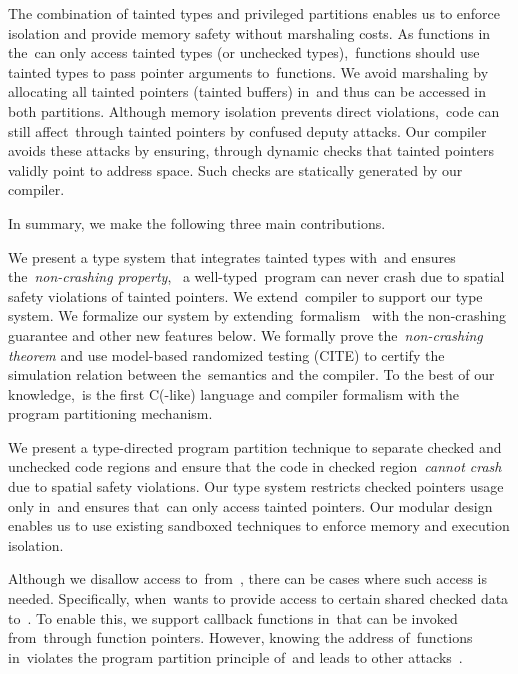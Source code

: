 The combination of tainted types and privileged partitions enables us to enforce isolation and provide memory safety without marshaling costs.
As functions in the~\ucregion can only access tainted types (or unchecked types),~\cregion functions should use tainted types to pass pointer arguments to~\ucregion functions. 
We avoid marshaling by allocating all tainted pointers (\ie tainted buffers) in~\ucregion and thus can be accessed in both partitions.
Although memory isolation prevents direct violations,~\ucregion code can still affect~\cregion through tainted pointers by confused deputy attacks.
Our compiler avoids these attacks by ensuring, through dynamic checks that tainted pointers validly point to \ucregion address space.
Such checks are statically generated by our compiler.

In summary, we make the following three main contributions.

We present a type system that integrates tainted types with~\checkedc and ensures the~\emph{non-crashing property},~\ie 
a well-typed~\systemname program can never crash due to spatial safety violations of tainted pointers.
We extend~\checkedc compiler to support our type system.
We formalize our system by extending~\checkedc formalism~\citet{li22checkedc} with the non-crashing guarantee and other new features below.
We formally prove the~\emph{non-crashing theorem} and use model-based randomized testing (CITE) to certify the simulation relation between the~\systemname semantics and the compiler.
To the best of our knowledge,~\systemname is the first C(-like) language and compiler formalism with the program partitioning mechanism.

We present a type-directed program partition technique to separate checked and unchecked code regions and ensure that the code in checked region~\textit{cannot crash} due to spatial safety violations.
Our type system restricts checked pointers usage only in~\cregion and ensures that~\ucregion can only access tainted pointers.
Our modular design enables us to use existing sandboxed techniques to enforce memory and execution isolation.

Although we disallow access to~\cregion from~\ucregion, there can be cases where such access is needed.
Specifically, when~\cregion wants to provide access to certain shared checked data to~\ucregion.
To enable this, we support callback functions in~\cregion that can be invoked from~\ucregion through function pointers.
However, knowing the address of~\cregion functions in~\ucregion violates the program partition principle of~\systemname and leads to other attacks~\cite{hauser2019sleak}.

